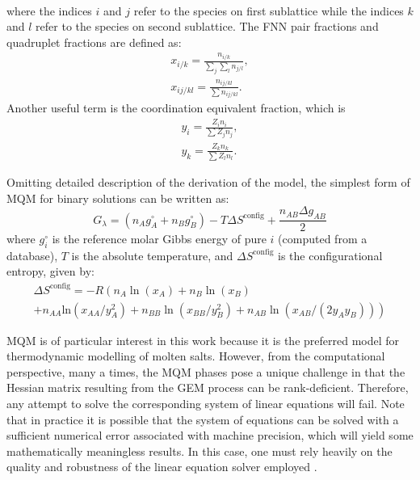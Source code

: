 \begin{enumerate}
\begin{gather}
        \end{gather}
        where the indices $i$ and $j$ refer to the species on first sublattice while the indices $k$ and $l$ refer to the species on second sublattice.
        The FNN pair fractions and quadruplet fractions are defined as:
        \begin{gather} \label{EqPairFraction}
            x_{i/k} = \frac{n_{i/k}}{\sum_j \sum_l n_{j/l}}, \\
            x_{ij/kl} = \frac{n_{ij/kl}}{\sum n_{ij/kl}}.
        \end{gather}
        Another useful term is the coordination equivalent fraction, which is
            \begin{gather} \label{EqCoordEqFraction}
	            y_i = \frac{Z_i n_i}{\sum Z_j n_j}, \\
	            y_k = \frac{Z_k n_k}{\sum Z_l n_l}.
            \end{gather}
	\end{enumerate}
	Omitting detailed description of the derivation of the model, the simplest form of MQM for binary solutions can be written as:
	\begin{equation} \label{EqGibbsMQM1}
		G_{\lambda} = (n_A g_A^\circ + n_B g_B^\circ) - T\Delta S^\text{config} + \frac{n_{AB} \Delta g_{AB}}{2}
	\end{equation}
	where $g_i^\circ$ is the reference molar Gibbs energy of pure $i$ (computed from a database), $T$ is the absolute temperature, and $\Delta S^\text{config}$ is the configurational entropy, given by:
	\begin{multline} \label{EqConfigEntropy}
		\Delta S^\text{config} = -R\left( n_A \ln(x_A) + n_B \ln(x_B) \right . \\
		+ \left . n_{AA}\textrm{ln}(x_{AA}/y_A^2) + n_{BB}\ln(x_{BB}/y_B^2) +n_{AB}\ln(x_{AB}/(2y_A y_B)) \right)
	\end{multline}

	MQM is of particular interest in this work because it is the preferred model for thermodynamic modelling of molten salts. However, from the computational perspective, many a times, the MQM phases pose a unique challenge in that the Hessian matrix resulting from the GEM process can be rank-deficient. Therefore, any attempt to solve the corresponding system of linear equations will fail. Note that in practice it is possible that the system of equations can be solved with a sufficient numerical error associated with machine precision, which will yield some mathematically meaningless results. In this case, one must rely heavily on the quality and robustness of the linear equation solver employed \cite{Piro:2019aa}. %
	
